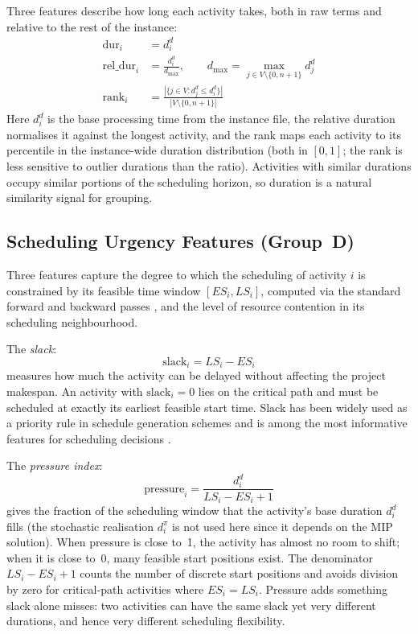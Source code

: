 Three features describe how long each activity takes, both in
raw terms and relative to the rest of the instance:
\begin{align}
    \mathrm{dur}_i        &= d_i^d
    \label{eq:dur} \\[4pt]
    \mathrm{rel\_dur}_i   &= \frac{d_i^d}{d_{\max}},
    \qquad d_{\max} = \max_{j \in V \setminus \{0, n{+}1\}} d_j^d
    \label{eq:rel_dur} \\[4pt]
    \mathrm{rank}_i       &= \frac{|\{j \in V : d_j^d \leq d_i^d\}|}
                               {|V \setminus \{0, n{+}1\}|}
    \label{eq:dur_rank}
\end{align}
Here $d_i^d$ is the base processing time from the instance file,
the relative duration normalises it against the longest activity,
and the rank maps each activity to its percentile in the
instance-wide duration distribution (both in $[0,1]$; the rank
is less sensitive to outlier durations than the ratio).
Activities with similar durations occupy similar portions of the
scheduling horizon, so duration is a natural similarity signal
for grouping.

\subsection{Scheduling Urgency Features (Group~D)}
\label{subsec:sched_features}
Three features capture the degree to which the scheduling of
activity $i$ is constrained by its feasible time window
$[ES_i, LS_i]$, computed via the standard forward and backward
passes \parencite{Kelley1963}, and the level of resource
contention in its scheduling neighbourhood.

The \textit{slack}:
\begin{equation}
    \mathrm{slack}_i = LS_i - ES_i
    \label{eq:slack}
\end{equation}
measures how much the activity can be delayed without affecting
the project makespan. An activity with $\mathrm{slack}_i = 0$
lies on the critical path \parencite{Kelley1963} and must be scheduled
at exactly its earliest feasible start time. Slack has been widely
used as a priority rule in schedule generation schemes
\parencite{Kolisch1999} and is among the most informative features for
scheduling decisions \parencite{Hartmann1998}.

The \textit{pressure index}:
\begin{equation}
    \mathrm{pressure}_i = \frac{d_i^d}{LS_i - ES_i + 1}
    \label{eq:pressure}
\end{equation}
gives the fraction of the scheduling window that the activity's
base duration $d_i^d$ fills (the stochastic realisation
$d_i^{\pi}$ is not used here since it depends on the MIP
solution). When pressure is close to~1, the activity has almost
no room to shift; when it is close to~0, many feasible start
positions exist. The denominator $LS_i - ES_i + 1$ counts the
number of discrete start positions and avoids division by zero
for critical-path activities where $ES_i = LS_i$. Pressure adds
something slack alone misses: two activities can have the same
slack yet very different durations, and hence very different
scheduling flexibility.

